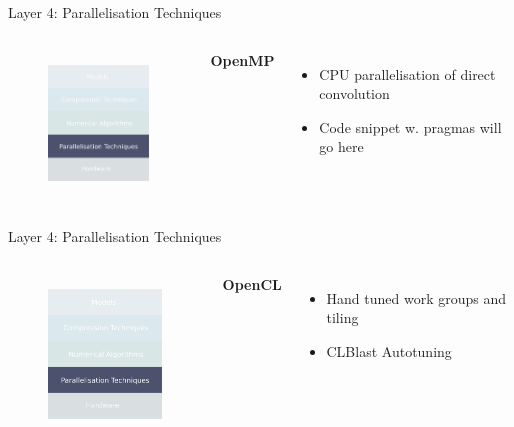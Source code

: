 \documentclass[xcolor=dvipsnames]{beamer}
\begin{document}
\begin{frame}{Layer 4: Parallelisation Techniques}

\begin{columns}


\begin{figure}
    \centering
    \includegraphics[width=3.5cm]{images/parallelisations.pdf}
    \label{fig:inference-stack-parallels}
\end{figure}


\textbf{OpenMP}
\begin{itemize}
    \item CPU parallelisation of direct convolution 
    \item Code snippet w. pragmas will go here
\end{itemize}

\end{columns}

\end{frame}


\begin{frame}{Layer 4: Parallelisation Techniques}

\begin{columns}


\begin{figure}
    \centering
    \includegraphics[width=3.5cm]{images/parallelisations.pdf}
    \label{fig:inference-stack-parallels-2}
\end{figure}


\textbf{OpenCL}
\begin{itemize}
    \item Hand tuned work groups and tiling
    \item CLBlast Autotuning 
\end{itemize}

\end{columns}

\end{frame}
\end{document}
